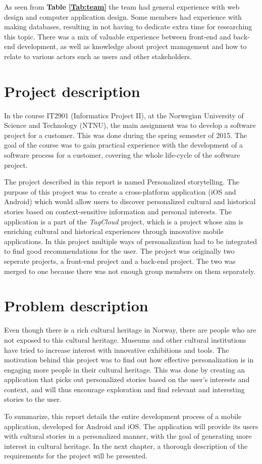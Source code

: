 As seen from \textbf{Table \ref{Tab:team}} the team had general experience with web design and computer application design. Some members had experience with making databases, resulting in not having to dedicate extra time for researching this topic. There was a mix of valuable experience between front-end and back-end development, as well as knowledge about project management and how to relate to various actors such as users and other stakeholders.

\section{Project description}

In the course IT2901 \cite{es20} (Informatics Project II), at the Norwegian University of Science and Technology (NTNU), the main assignment was to develop a software project for a customer. This was done during the spring semester of 2015. The goal of the course was to gain practical experience with the development of a software process for a customer, covering the whole life-cycle of the software project.\newline

The project described in this report is named Personalized storytelling. The purpose of this project was to create a cross-platform application (iOS and Android) which would allow users to discover personalized cultural and historical stories based on context-sensitive information and personal interests. The application is a part of the \textit{TagCloud} \cite{es21} project, which is a project whose aim is enriching cultural and historical experiences through innovative mobile applications.
In this project multiple ways of personalization had to be integrated to find good recommendations for the user. The project was originally two seperate projects, a front-end project and a back-end project. The two was merged to one because there was not enough group members on them separately. 

\section{Problem description}

Even though there is a rich cultural heritage in Norway, there are people who are not exposed to this cultural heritage. Museums and other cultural institutions have tried to increase interest with innovative exhibitions and tools. The motivation behind this project was to find out how effective personalization is in engaging more people in their cultural heritage. This was done by creating an application that picks out personalized stories based on the user's interests and context, and will thus encourage exploration and find relevant and interesting stories to the user. \newline

To summarize, this report details the entire development process of a mobile application, developed for Android and iOS. The application will provide its users with cultural stories in a personalized manner, with the goal of generating more interest in cultural heritage. In the next chapter, a thorough description of the requirements for the project will be presented.

\cleardoublepage